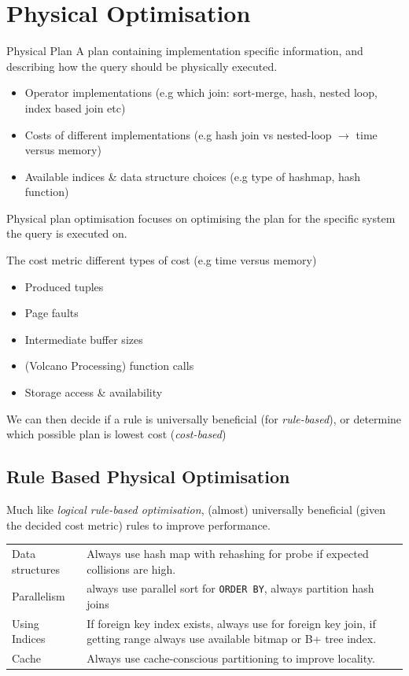 \section{Physical Optimisation}
\begin{definitionbox}{Physical Plan}
    A plan containing implementation specific information, and describing how the query should be physically executed.
    \begin{itemize}
        \item Operator implementations (e.g which join: sort-merge, hash, nested loop, index based join etc)
        \item Costs of different implementations (e.g hash join vs nested-loop $\to$ time versus memory)
        \item Available indices \& data structure choices (e.g type of hashmap, hash function)
    \end{itemize} 
    Physical plan optimisation focuses on optimising the plan for the specific system the query is executed on.
\end{definitionbox}

The cost metric different types of cost (e.g time versus memory)
\begin{itemize}
    \item Produced tuples
    \item Page faults
    \item Intermediate buffer sizes
    \item (Volcano Processing) function calls
    \item Storage access \& availability
\end{itemize}
We can then decide if a rule is universally beneficial (for \textit{rule-based}), or determine which possible plan is lowest cost (\textit{cost-based})

\subsection{Rule Based Physical Optimisation}
Much like \textit{logical rule-based optimisation}, (almost) universally beneficial (given the decided cost metric) rules to improve performance.
\begin{center}
    \begin{tabular}{l p{}}
        Data structures & Always use hash map with rehashing for probe if expected collisions are high.  \\
        Parallelism     & always use parallel sort for \texttt{ORDER BY}, always partition hash joins \\
        Using Indices   & If foreign key index exists, always use for foreign key join, if getting range always use available bitmap or B+ tree index. \\
        Cache           & Always use cache-conscious partitioning to improve locality. \\
    \end{tabular}
\end{center}

